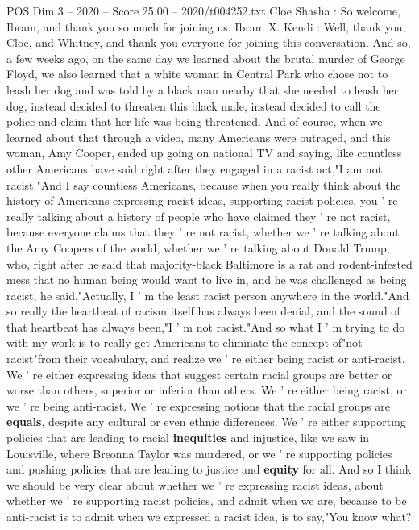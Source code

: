 \begin{textsample}{POS Dim 3 – 2020 – Score 25.00 – 2020/t004252.txt}  \label{ex:f3_pos_015}
Cloe Shasha : So welcome, Ibram, and thank you so much for joining us.
Ibram X.
Kendi : Well, thank you, Cloe, and Whitney, and thank you everyone for joining this conversation.
And so, a few weeks ago, on the same day we learned about the brutal murder of George Floyd, we also learned that a white woman in Central Park who chose not to leash her dog and was told by a black man nearby that she needed to leash her dog, instead decided to threaten this black male, instead decided to call the police and claim that her life was being threatened.
And of course, when we learned about that through a video, many Americans were outraged, and this woman, Amy Cooper, ended up going on national TV and saying, like countless other Americans have said right after they engaged in a racist act,"I am not racist."And I say countless Americans, because when you really think about the history of Americans expressing racist ideas, supporting racist policies, you ' re really talking about a history of people who have claimed they ' re not racist, because everyone claims that they ' re not racist, whether we ' re talking about the Amy Coopers of the world, whether we ' re talking about Donald Trump, who, right after he said that majority-black Baltimore is a rat and rodent-infested mess that no human being would want to live in, and he was challenged as being racist, he said,"Actually, I ' m the least racist person anywhere in the world."And so really the heartbeat of racism itself has always been denial, and the sound of that heartbeat has always been,"I ' m not racist."And so what I ' m trying to do with my work is to really get Americans to eliminate the concept of"not racist"from their vocabulary, and realize we ' re either being racist or anti-racist.
We ' re either expressing ideas that suggest certain racial groups are better or worse than others, superior or inferior than others.
We ' re either being racist, or we ' re being anti-racist.
We ' re expressing notions that the racial groups are \textbf{equals}, despite any cultural or even ethnic differences.
We ' re either supporting policies that are leading to racial \textbf{inequities} and injustice, like we saw in Louisville, where Breonna Taylor was murdered, or we ' re supporting policies and pushing policies that are leading to justice and \textbf{equity} for all.
And so I think we should be very clear about whether we ' re expressing racist ideas, about whether we ' re supporting racist policies, and admit when we are, because to be anti-racist is to admit when we expressed a racist idea, is to say,"You know what?

\end{textsample}
